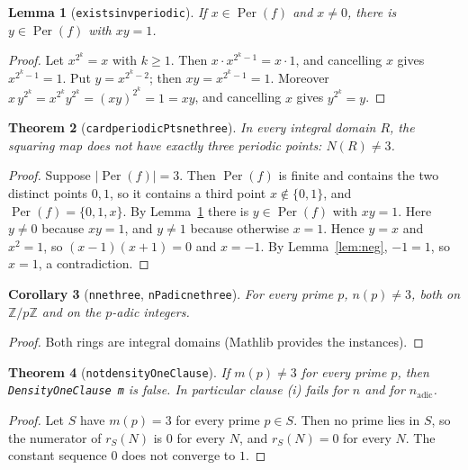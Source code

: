 \documentclass[11pt]{article}
\newtheorem{theorem}{Theorem}
\newtheorem{lemma}[theorem]{Lemma}
\newtheorem{corollary}[theorem]{Corollary}
\theoremstyle{definition}
\theoremstyle{remark}
\renewcommand{\_}{\oldus\allowbreak}
\newcommand{\Per}{\operatorname{Per}}
\begin{document}
\begin{lemma}[\texttt{exists\_inv\_periodic}]\label{lem:inv}
If $x \in \Per(f)$ and $x \ne 0$, there is $y \in \Per(f)$ with $xy = 1$.
\end{lemma}
\begin{proof}
Let $x^{2^k} = x$ with $k \ge 1$. Then $x \cdot x^{2^k-1} = x \cdot 1$, and cancelling $x$ gives
$x^{2^k - 1} = 1$. Put $y = x^{2^k-2}$; then $xy = x^{2^k-1} = 1$. Moreover
$x\, y^{2^k} = x^{2^k} y^{2^k} = (xy)^{2^k} = 1 = xy$, and cancelling $x$ gives $y^{2^k} = y$.
\end{proof}

\begin{theorem}[\texttt{card\_periodicPts\_ne\_three}]\label{thm:main}
In every integral domain $R$, the squaring map does not have exactly three periodic points:
$N(R) \ne 3$.
\end{theorem}
\begin{proof}
Suppose $|\Per(f)| = 3$. Then $\Per(f)$ is finite and contains the two distinct points $0, 1$, so it contains
a third point $x \notin \{0,1\}$, and $\Per(f) = \{0, 1, x\}$. By Lemma~\ref{lem:inv} there is
$y \in \Per(f)$ with $xy = 1$. Here $y \ne 0$ because $xy = 1$, and $y \ne 1$ because otherwise $x = 1$.
Hence $y = x$ and $x^2 = 1$, so $(x-1)(x+1) = 0$ and $x = -1$. By Lemma~\ref{lem:neg}, $-1 = 1$, so $x = 1$,
a contradiction.
\end{proof}

\begin{corollary}[\texttt{n\_ne\_three}, \texttt{nPadic\_ne\_three}]
For every prime $p$, $n(p) \ne 3$, both on $\mathbb{Z}/p\mathbb{Z}$ and on the $p$-adic integers.
\end{corollary}
\begin{proof}
Both rings are integral domains (Mathlib provides the instances).
\end{proof}

\begin{theorem}[\texttt{not\_densityOneClause}]
If $m(p) \ne 3$ for every prime $p$, then \texttt{DensityOneClause m} is false. In particular clause (i)
fails for $n$ and for $n_{\mathrm{adic}}$.
\end{theorem}
\begin{proof}
Let $S$ have $m(p) = 3$ for every prime $p \in S$. Then no prime lies in $S$, so the numerator of
$r_S(N)$ is $0$ for every $N$, and $r_S(N) = 0$ for every $N$. The constant sequence $0$ does not converge
to $1$.
\end{proof}
\end{document}
